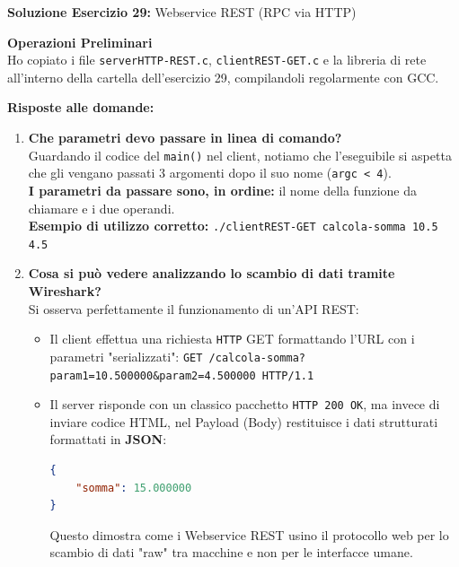 \documentclass[11pt]{article}
\begin{document}
\begin{tcolorbox}[colback=green!5!white,colframe=green!75!black,title=\textbf{RISPOSTA}, breakable]
\textbf{Soluzione Esercizio 29:} Webservice REST (RPC via HTTP)

\textbf{Operazioni Preliminari}\\
Ho copiato i file \texttt{serverHTTP-REST.c}, \texttt{clientREST-GET.c} e la libreria di rete all'interno della cartella dell'esercizio 29, compilandoli regolarmente con GCC.

\textbf{Risposte alle domande:}

\begin{enumerate}
    \item \textbf{Che parametri devo passare in linea di comando?}\\
    Guardando il codice del \texttt{main()} nel client, notiamo che l'eseguibile si aspetta che gli vengano passati 3 argomenti dopo il suo nome (\texttt{argc < 4}).\\
    \textbf{I parametri da passare sono, in ordine:} il nome della funzione da chiamare e i due operandi.\\
    \textbf{Esempio di utilizzo corretto:} \texttt{./clientREST-GET calcola-somma 10.5 4.5}

    \item \textbf{Cosa si può vedere analizzando lo scambio di dati tramite Wireshark?}\\
    Si osserva perfettamente il funzionamento di un'API REST:
    \begin{itemize}
        \item Il client effettua una richiesta \texttt{HTTP} GET formattando l'URL con i parametri "serializzati": \texttt{GET /calcola-somma?param1=10.500000\&param2=4.500000 HTTP/1.1}
        \item Il server risponde con un classico pacchetto \texttt{HTTP 200 OK}, ma invece di inviare codice HTML, nel Payload (Body) restituisce i dati strutturati formattati in \textbf{JSON}:
\begin{lstlisting}[language=json, basicstyle=\ttfamily\small]
{
    "somma": 15.000000
}
\end{lstlisting}
        Questo dimostra come i Webservice REST usino il protocollo web per lo scambio di dati "raw" tra macchine e non per le interfacce umane.
    \end{itemize}


\end{enumerate}
\end{tcolorbox}
\end{document}
